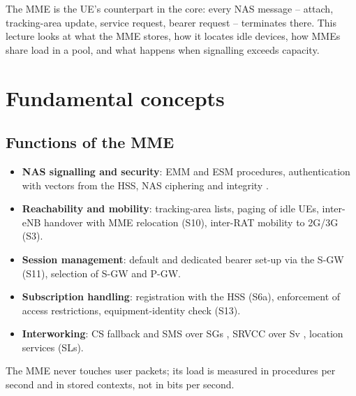 \documentclass[11pt,a4paper]{article}
\begin{document}
The MME is the UE's counterpart in the core: every NAS message -- attach, tracking-area update, service
request, bearer request -- terminates there. This lecture looks at what the MME stores, how it locates
idle devices, how MMEs share load in a pool, and what happens when signalling exceeds capacity.

\section{Fundamental concepts}

\subsection{Functions of the MME}
\begin{itemize}
  \item \textbf{NAS signalling and security}: EMM and ESM procedures, authentication with vectors from
        the HSS, NAS ciphering and integrity \cite{ts24301,ts33401}.
  \item \textbf{Reachability and mobility}: tracking-area lists, paging of idle UEs, inter-eNB handover
        with MME relocation (S10), inter-RAT mobility to 2G/3G (S3).
  \item \textbf{Session management}: default and dedicated bearer set-up via the S-GW (S11), selection of
        S-GW and P-GW.
  \item \textbf{Subscription handling}: registration with the HSS (S6a), enforcement of access
        restrictions, equipment-identity check (S13).
  \item \textbf{Interworking}: CS fallback and SMS over SGs \cite{ts23272}, SRVCC over Sv \cite{ts23216},
        location services (SLs).
\end{itemize}
The MME never touches user packets; its load is measured in procedures per second and in stored
contexts, not in bits per second.
\end{document}
